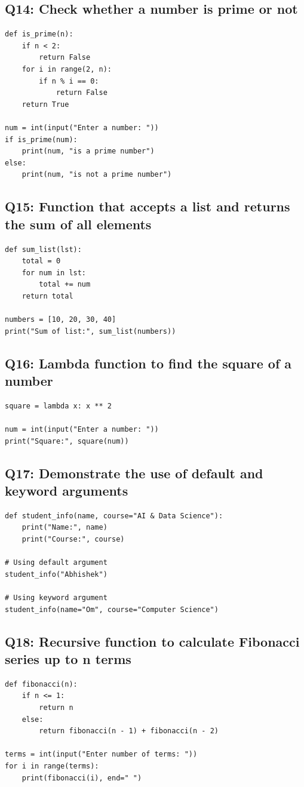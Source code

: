 \documentclass[11pt,a4paper]{article}
\begin{document}
\subsection{Q14: Check whether a number is prime or not}
\begin{lstlisting}
def is_prime(n):
    if n < 2:
        return False
    for i in range(2, n):
        if n % i == 0:
            return False
    return True

num = int(input("Enter a number: "))
if is_prime(num):
    print(num, "is a prime number")
else:
    print(num, "is not a prime number")
\end{lstlisting}

\subsection{Q15: Function that accepts a list and returns the sum of all elements}
\begin{lstlisting}
def sum_list(lst):
    total = 0
    for num in lst:
        total += num
    return total

numbers = [10, 20, 30, 40]
print("Sum of list:", sum_list(numbers))
\end{lstlisting}

\subsection{Q16: Lambda function to find the square of a number}
\begin{lstlisting}
square = lambda x: x ** 2

num = int(input("Enter a number: "))
print("Square:", square(num))
\end{lstlisting}

\subsection{Q17: Demonstrate the use of default and keyword arguments}
\begin{lstlisting}
def student_info(name, course="AI & Data Science"):
    print("Name:", name)
    print("Course:", course)

# Using default argument
student_info("Abhishek")

# Using keyword argument
student_info(name="Om", course="Computer Science")
\end{lstlisting}

\subsection{Q18: Recursive function to calculate Fibonacci series up to n terms}
\begin{lstlisting}
def fibonacci(n):
    if n <= 1:
        return n
    else:
        return fibonacci(n - 1) + fibonacci(n - 2)

terms = int(input("Enter number of terms: "))
for i in range(terms):
    print(fibonacci(i), end=" ")
\end{lstlisting}
\end{document}
